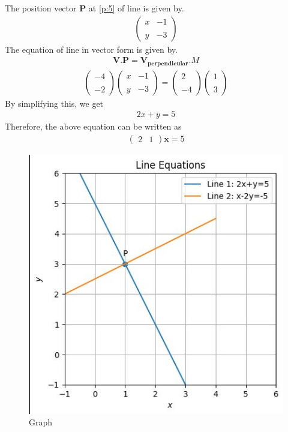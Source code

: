 \documentclass[12pt]{article}
\newcommand{\myvec}[1]{\ensuremath{\begin{pmatrix}#1\end{pmatrix}}}
\let\vec\mathbf
\begin{document}
    The position vector $\vec{P}$ at \eqref{p:5} of line is given by.
	    \begin{align}
			    \myvec{x & -1 \\ \\ y & -3}
	    \end{align}
    The equation of line in vector form is given by.\\
    \begin{align}
         \vec{V} . \vec{P} = \vec{V_{perpendicular}} . M
    \end{align}
    \begin{align}
	    \myvec{-4 \\ \\ -2} 
	    \myvec{x & -1 \\ \\ y & -3}
    =
	    \myvec{ 2 \\ \\ -4}
	    \myvec{1 \\ \\ 3}
    \end{align}
    By simplifying this, we get
    \begin{align}
        2x + y = 5
    \end{align}
    Therefore, the above equation can be written as
    \begin{align}
	    \myvec{2 & 1}\vec{x} = 5
    \end{align}

    \begin{figure}[H]
  \centering
  \includegraphics[width=\columnwidth]{figs/graph.jpg}
  \caption{Graph}
  \label{fig:pic}
\end{figure}
\end{document}
